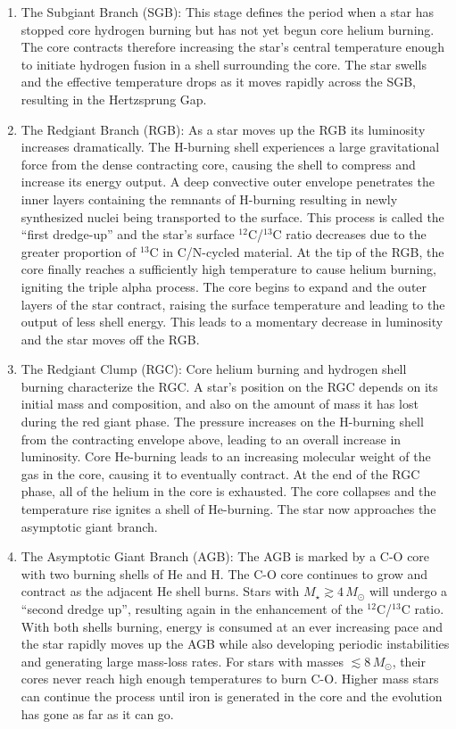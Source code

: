 \begin{enumerate}
%
\item The Subgiant Branch (SGB): This stage defines the period when a star has stopped core hydrogen burning but has not yet begun core helium burning. The core contracts therefore increasing the star's central temperature enough to initiate hydrogen fusion in a shell surrounding the core. The star swells and the effective temperature drops as it moves rapidly across the SGB, resulting in the Hertzsprung Gap.
%
\item The Redgiant Branch (RGB): As a star moves up the RGB its luminosity increases dramatically. The H-burning shell experiences a large gravitational force from the dense contracting core, causing the shell to compress and increase its energy output. A deep convective outer envelope penetrates the inner layers containing the remnants of H-burning resulting in newly synthesized nuclei being transported to the surface. This process is called the ``first dredge-up'' and the star's surface $^{12}$C/$^{13}$C ratio decreases due to the greater proportion of $^{13}$C in C/N-cycled material. At the tip of the RGB, the core finally reaches a sufficiently high temperature to cause helium burning, igniting the triple alpha process. The core begins to expand and the outer layers of the star contract, raising the surface temperature and leading to the output of less shell energy. This leads to a momentary decrease in luminosity and the star moves off the RGB.
%
\item The Redgiant Clump (RGC): Core helium burning and hydrogen shell burning characterize the RGC. A star's position on the RGC depends on its initial mass and composition, and  also on the amount of mass it has lost during the red giant phase. The pressure increases on the H-burning shell from the contracting envelope above, leading to an overall increase in luminosity. Core He-burning leads to an increasing molecular weight of the gas in the core, causing it to eventually contract. At the end of the RGC phase, all of the helium in the core is exhausted. The core collapses and the temperature rise ignites a shell of He-burning. The star now approaches the asymptotic giant branch.
%
\item The Asymptotic Giant Branch (AGB): The AGB is marked by a C-O core with two burning shells of He and H. The C-O core continues to grow and contract as the adjacent He shell burns. Stars with $M_{\star} \gtrsim 4\,M_{\odot}$ will undergo a ``second dredge up'', resulting again in the enhancement of the $^{12}$C/$^{13}$C ratio. With both shells burning, energy is consumed at an ever increasing pace and the star rapidly moves up the AGB while also developing periodic instabilities and generating large mass-loss rates. For stars with masses $\lesssim 8\,M_{\odot}$, their cores never reach high enough temperatures to burn C-O. Higher mass stars can continue the process until iron is generated in the core and the evolution has gone as far as it can go.
\end{enumerate}
